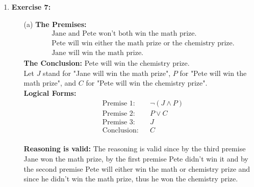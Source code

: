 \documentclass{article} %
\begin{document}
\begin{enumerate}
        \item \textbf{Exercise 7:}
        \begin{itemize}
            \item[(a)] \textbf{The Premises:}
            \begin{align*}
                &\text{Jane and Pete won't both win the math prize.} \\
                &\text{Pete will win either the math prize or the chemistry prize.} \\
                &\text{Jane will win the math prize.}
            \end{align*}
            \textbf{The Conclusion:} Pete will win the chemistry prize. \\
            Let \(J\) stand for "Jane will win the math prize", \(P\) for "Pete will win the math prize", and \(C\) for "Pete will win the chemistry prize". \\
            \textbf{Logical Forms:}
            \begin{align*}
                &\text{Premise 1:} && \neg (J \wedge P) \\
                &\text{Premise 2:} && P \vee C \\
                &\text{Premise 3:} && J \\
                &\text{Conclusion:} && C 
            \end{align*} \\
            \textbf{Reasoning is valid:} The reasoning is valid since by the third premise Jane won the math prize, by the first premise Pete didn't win it and by the second premise Pete will either win the math or chemistry prize and since he didn't win the math prize, thus he won the chemistry prize.


\end{itemize}
\end{enumerate}
\end{document}
